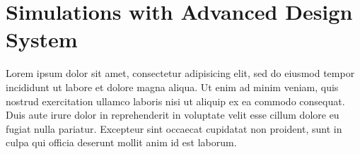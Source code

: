 \documentclass[report.tex]{subfiles}
\begin{document}
\pagebreak \section{Simulations with Advanced Design System}
Lorem ipsum dolor sit amet, consectetur adipisicing elit, sed do eiusmod tempor incididunt ut labore et dolore magna aliqua. Ut enim ad minim veniam, quis nostrud exercitation ullamco laboris nisi ut aliquip ex ea commodo consequat. Duis aute irure dolor in reprehenderit in voluptate velit esse cillum dolore eu fugiat nulla pariatur. Excepteur sint occaecat cupidatat non proident, sunt in culpa qui officia deserunt mollit anim id est laborum.








\end{document}
